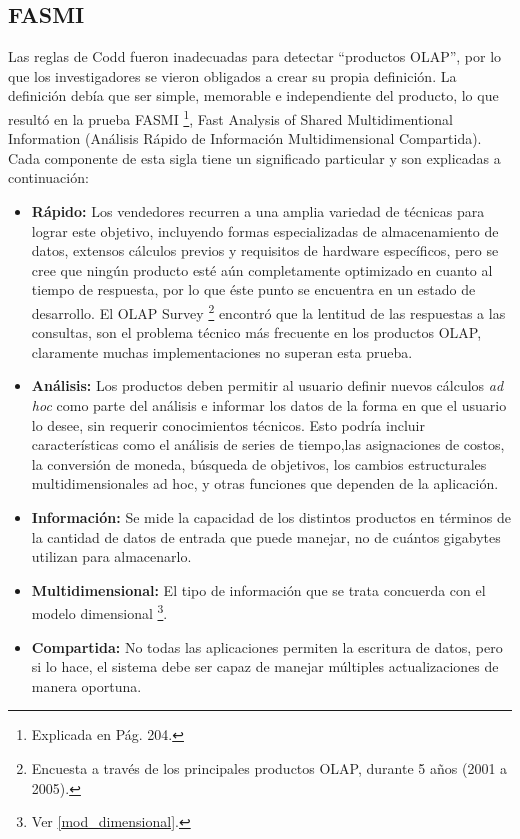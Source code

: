 \documentclass[a4paper,11pt]{article}
\begin{document}
    
    \subsection{FASMI}
    
    Las reglas de Codd fueron inadecuadas para detectar ``productos OLAP'', por lo que los investigadores se vieron obligados a crear su propia
    definición. La definición debía que ser simple, memorable e independiente del producto, lo que resultó en la prueba FASMI \footnote{Explicada en
    \cite{nagabhushana} Pág. 204.}, Fast Analysis of Shared Multidimentional Information (Análisis Rápido de Información 
    Multidimensional Compartida). Cada componente de esta sigla tiene un significado particular y son explicadas a continuación:
    
    \begin{itemize}
      \item \textbf{Rápido:} Los vendedores recurren a una amplia variedad de técnicas para lograr este objetivo, incluyendo formas especializadas de
      almacenamiento de datos, extensos cálculos previos y requisitos de hardware específicos, pero se cree que ningún producto esté aún completamente
      optimizado en cuanto al tiempo de respuesta, por lo que éste punto se encuentra en un estado de desarrollo.
      El OLAP Survey \footnote{Encuesta a través de los principales productos OLAP, durante 5 años (2001 a 2005).} encontró
      que la lentitud de las respuestas a las consultas, son el problema técnico más frecuente en los productos OLAP, claramente muchas implementaciones
      no superan esta prueba.
      \item \textbf{Análisis:} Los productos deben permitir al usuario definir nuevos cálculos \textit{ad hoc} como parte del análisis e informar los datos de la
      forma en que el usuario lo desee, sin requerir conocimientos técnicos. Esto podría incluir características como el análisis de series de tiempo,las
      asignaciones de costos, la conversión de moneda, búsqueda de objetivos, los cambios estructurales multidimensionales ad hoc, y otras funciones que
      dependen de la aplicación.
      \item \textbf{Información:} Se mide la capacidad de los distintos productos en términos de la cantidad de datos de entrada que puede manejar,
      no de cuántos gigabytes utilizan para almacenarlo.
      \item \textbf{Multidimensional:} El tipo de información que se trata concuerda con el modelo dimensional \footnote{Ver \ref{mod_dimensional}.}.
      \item \textbf{Compartida:} No todas las aplicaciones permiten la escritura de datos, pero si lo hace, el sistema debe ser capaz de manejar múltiples
      actualizaciones de manera oportuna.
    \end{itemize}
    
\end{document}

